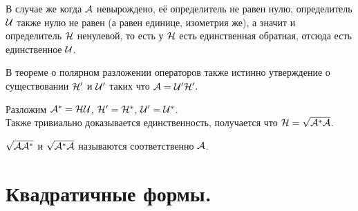 \documentclass{article}
\begin{document}
\begin{itemize}
\begin{Proof}
            В случае же когда ${\mathcal{A}}$ невырождено, её определитель не равен нулю, определитель ${\mathcal{U}}$ также нулю не равен (а равен единице, изометрия же), а значит и определитель ${\mathcal{H}}$ ненулевой, то есть у ${\mathcal{H}}$ есть единственная обратная, отсюда есть единственное ${\mathcal{U}}$.
        \end{Proof}
        \thm В теореме о полярном разложении операторов также истинно утверждение о существовании ${\mathcal{H}}'$ и ${\mathcal{U}}'$ таких что ${\mathcal{A}}={\mathcal{U}}'{\mathcal{H}}'$.
        \begin{Proof}
            Разложим ${\mathcal{A}}^*={\mathcal{H}}{\mathcal{U}}$, ${\mathcal{H}}'={\mathcal{H}}^*$, ${\mathcal{U}}'={\mathcal{U}}^*$.\\
            Также тривиально доказывается единственность, получается что ${\mathcal{H}}=\sqrt{{\mathcal{A}}^*{\mathcal{A}}}$.
        \end{Proof}
        \dfn $\sqrt{{\mathcal{A}}{\mathcal{A}}^*}$ и $\sqrt{{\mathcal{A}}^*{\mathcal{A}}}$ называются соответственно  ${\mathcal{A}}$.
    \end{itemize}
    \section{Квадратичные формы.}
\end{document}
